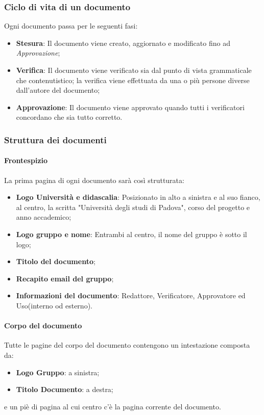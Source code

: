 	\subsubsection{Ciclo di vita di un documento} %
		Ogni documento passa per le seguenti fasi:
			\begin{itemize}
				\item \textbf{Stesura}: Il documento viene creato, aggiornato e modificato fino ad \emph{Approvazione};
				\item  \textbf{Verifica}: Il documento viene verificato sia dal punto di vista grammaticale che contenutistico; la verifica viene effettuata da una o più persone diverse dall'autore del documento;
				\item \textbf{Approvazione}: Il documento viene approvato quando tutti i verificatori concordano che sia tutto corretto. %
			\end{itemize}
	\subsubsection{Struttura dei documenti}
		\paragraph{Frontespizio}    
			La prima pagina di ogni documento sarà così strutturata:
				\begin{itemize}
					\item \textbf{Logo Università e didascalia}: Posizionato in alto a sinistra e al suo fianco, al centro, la scritta "Università degli studi di Padova", corso del progetto e anno accademico;
					\item \textbf{Logo gruppo e nome}: Entrambi al centro, il nome del gruppo è sotto il logo;
					\item \textbf{Titolo del documento};
					\item \textbf{Recapito email del gruppo};
					\item \textbf{Informazioni del documento}: Redattore, Verificatore, Approvatore ed Uso(interno od esterno).
				\end{itemize}
	
		\paragraph{Corpo del documento}       
			Tutte le pagine del corpo del documento contengono un intestazione composta da:
				\begin{itemize}
					\item \textbf{Logo Gruppo}: a sinistra;
					\item \textbf{Titolo Documento}: a destra;
				\end{itemize}
			e un piè di pagina al cui centro c'è la pagina corrente del documento.
	
